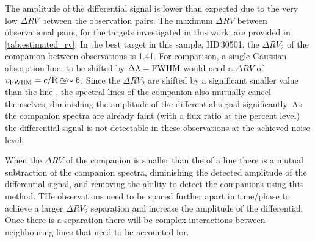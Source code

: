 The amplitude of the differential signal is lower than expected due to the very low \(\Delta {RV}\) between the observation pairs.
The maximum \(\Delta {RV}\) between observational pairs, for the targets investigated in this work, are provided in \cref{tab:estimated_rv}.
In the best target in this sample, {HD\,30501}, the \(\Delta {RV}_2\) of the companion between observations is 1.41\kmps{}.
For comparison, a single Gaussian absorption line, to be shifted by \(\Delta\lambda = {\textrm{FWHM}}\) would need a \(\Delta {RV}\) of \(v_{\textrm{FWHM}} = c/\textrm{R} \approxeq\sim6\)\kmps{}.
Since the \(\Delta {RV}_2\) are shifted by a significant smaller value than the line {\fwhm}, the spectral lines of the companion also mutually cancel themselves, diminishing the amplitude of the differential signal significantly.
As the companion spectra are already faint (with a flux ratio at the percent level) the differential signal is not detectable in these observations at the achieved noise level.

When the \(\Delta {RV}\) of the companion is smaller than the {\fwhm} of a line there is a mutual subtraction of the companion spectra, diminishing the detected amplitude of the differential signal, and removing the ability to detect the companions using this method.
THe observations need to be spaced further apart in time/phase to achieve a larger \(\Delta {RV}_2\) separation and increase the amplitude of the differential.
Once there is a separation there will be complex interactions between neighbouring lines that need to be accounted for.


